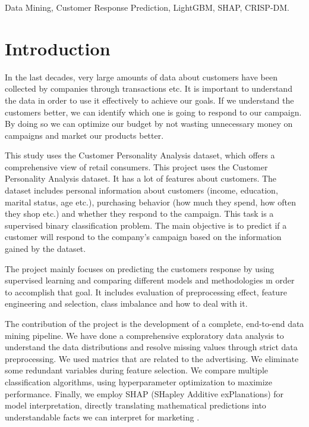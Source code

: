 \documentclass[conference]{IEEEtran}
\begin{document}
\begin{IEEEkeywords}
Data Mining, Customer Response Prediction, LightGBM, SHAP, CRISP-DM.
\end{IEEEkeywords}

\section{Introduction}
\label{sec:introduction}

In the last decades, very large amounts of data about customers have been collected by companies through transactions etc.
It is important to  understand the data in order to use it effectively to achieve our goals.
If we understand the customers better, we can identify which one is going to respond to our campaign.
By doing so we can optimize our budget by not wasting unnecessary money on campaigns and market our products better.

This study uses the Customer Personality Analysis dataset, which offers a comprehensive view of retail consumers.
This project uses the Customer Personality Analysis dataset. It has a lot of features about customers.
The dataset includes personal information about customers (income, education, marital status, age etc.), purchasing behavior (how much they spend, how often they shop etc.) and whether they respond to the campaign. This task is a supervised binary classification problem.
The main objective is to predict if a customer will respond to the company’s campaign based on the information gained by the dataset.

The project mainly focuses on predicting the customers response by using supervised learning and comparing different models and methodologies ın order to accomplish that goal.
It includes evaluation of preprocessing effect, feature engineering and selection, class imbalance and how to deal with it.

The  contribution of the project is the development of a complete, end-to-end data mining pipeline.
We have done a comprehensive exploratory data analysis to understand the  data distributions and resolve missing values through strict data preprocessing.
We used matrics that are related to the advertising.
We  eliminate some redundant variables during feature selection.
We compare multiple classification algorithms, using hyperparameter optimization to maximize performance. Finally, we employ SHAP (SHapley Additive exPlanations) for model interpretation, directly translating mathematical predictions into understandable facts we can interpret for marketing .
\end{document}
